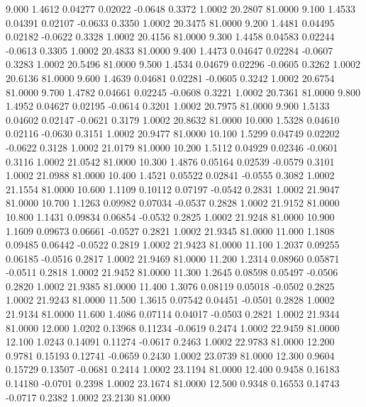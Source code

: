    9.000   1.4612   0.04277   0.02022  -0.0648   0.3372   1.0002  20.2807  81.0000
   9.100   1.4533   0.04391   0.02107  -0.0633   0.3350   1.0002  20.3475  81.0000
   9.200   1.4481   0.04495   0.02182  -0.0622   0.3328   1.0002  20.4156  81.0000
   9.300   1.4458   0.04583   0.02244  -0.0613   0.3305   1.0002  20.4833  81.0000
   9.400   1.4473   0.04647   0.02284  -0.0607   0.3283   1.0002  20.5496  81.0000
   9.500   1.4534   0.04679   0.02296  -0.0605   0.3262   1.0002  20.6136  81.0000
   9.600   1.4639   0.04681   0.02281  -0.0605   0.3242   1.0002  20.6754  81.0000
   9.700   1.4782   0.04661   0.02245  -0.0608   0.3221   1.0002  20.7361  81.0000
   9.800   1.4952   0.04627   0.02195  -0.0614   0.3201   1.0002  20.7975  81.0000
   9.900   1.5133   0.04602   0.02147  -0.0621   0.3179   1.0002  20.8632  81.0000
  10.000   1.5328   0.04610   0.02116  -0.0630   0.3151   1.0002  20.9477  81.0000
  10.100   1.5299   0.04749   0.02202  -0.0622   0.3128   1.0002  21.0179  81.0000
  10.200   1.5112   0.04929   0.02346  -0.0601   0.3116   1.0002  21.0542  81.0000
  10.300   1.4876   0.05164   0.02539  -0.0579   0.3101   1.0002  21.0988  81.0000
  10.400   1.4521   0.05522   0.02841  -0.0555   0.3082   1.0002  21.1554  81.0000
  10.600   1.1109   0.10112   0.07197  -0.0542   0.2831   1.0002  21.9047  81.0000
  10.700   1.1263   0.09982   0.07034  -0.0537   0.2828   1.0002  21.9152  81.0000
  10.800   1.1431   0.09834   0.06854  -0.0532   0.2825   1.0002  21.9248  81.0000
  10.900   1.1609   0.09673   0.06661  -0.0527   0.2821   1.0002  21.9345  81.0000
  11.000   1.1808   0.09485   0.06442  -0.0522   0.2819   1.0002  21.9423  81.0000
  11.100   1.2037   0.09255   0.06185  -0.0516   0.2817   1.0002  21.9469  81.0000
  11.200   1.2314   0.08960   0.05871  -0.0511   0.2818   1.0002  21.9452  81.0000
  11.300   1.2645   0.08598   0.05497  -0.0506   0.2820   1.0002  21.9385  81.0000
  11.400   1.3076   0.08119   0.05018  -0.0502   0.2825   1.0002  21.9243  81.0000
  11.500   1.3615   0.07542   0.04451  -0.0501   0.2828   1.0002  21.9134  81.0000
  11.600   1.4086   0.07114   0.04017  -0.0503   0.2821   1.0002  21.9344  81.0000
  12.000   1.0202   0.13968   0.11234  -0.0619   0.2474   1.0002  22.9459  81.0000
  12.100   1.0243   0.14091   0.11274  -0.0617   0.2463   1.0002  22.9783  81.0000
  12.200   0.9781   0.15193   0.12741  -0.0659   0.2430   1.0002  23.0739  81.0000
  12.300   0.9604   0.15729   0.13507  -0.0681   0.2414   1.0002  23.1194  81.0000
  12.400   0.9458   0.16183   0.14180  -0.0701   0.2398   1.0002  23.1674  81.0000
  12.500   0.9348   0.16553   0.14743  -0.0717   0.2382   1.0002  23.2130  81.0000
